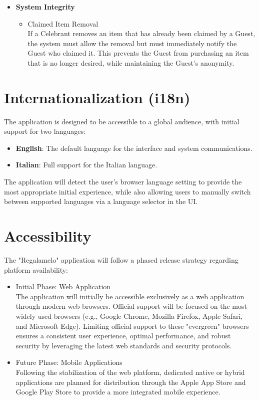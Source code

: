 \begin{itemize}
    \item \textbf{System Integrity}
    \begin{itemize}
        \item Claimed Item Removal \\
            If a Celebrant removes an item that has already been claimed by a Guest, the system must allow the removal but must immediately notify the Guest who claimed it. This prevents the Guest from purchasing an item that is no longer desired, while maintaining the Guest's anonymity.
    \end{itemize}
\end{itemize}

\section{Internationalization (i18n)}
The application is designed to be accessible to a global audience, with initial support for two languages:
\begin{itemize}
    \item \textbf{English}: The default language for the interface and system communications.
    \item \textbf{Italian}: Full support for the Italian language.
\end{itemize}
The application will detect the user's browser language setting to provide the most appropriate initial experience, while also allowing users to manually switch between supported languages via a language selector in the UI.

\section{Accessibility}
The "Regalamelo" application will follow a phased release strategy regarding platform availability:
\begin{itemize}
    \item Initial Phase: Web Application \\
        The application will initially be accessible exclusively as a web application through modern web browsers. Official support will be focused on the most widely used browsers (e.g., Google Chrome, Mozilla Firefox, Apple Safari, and Microsoft Edge). Limiting official support to these "evergreen" browsers ensures a consistent user experience, optimal performance, and robust security by leveraging the latest web standards and security protocols.
    \item Future Phase: Mobile Applications \\
        Following the stabilization of the web platform, dedicated native or hybrid applications are planned for distribution through the Apple App Store and Google Play Store to provide a more integrated mobile experience.
\end{itemize}

